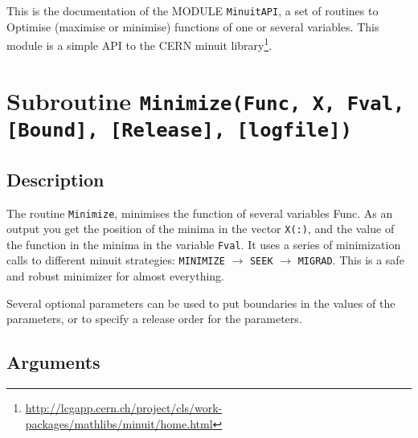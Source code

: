 
This is the documentation of the MODULE \texttt{MinuitAPI}, a set
of routines to Optimise (maximise or minimise) functions of one or
several variables. This module is a simple API to the CERN minuit
library\footnote{\href{http://lcgapp.cern.ch/project/cls/work-packages/mathlibs/minuit/home.html}{http://lcgapp.cern.ch/project/cls/work-packages/mathlibs/minuit/home.html}}. 

\section{Subroutine \texttt{Minimize(Func, X, Fval, [Bound], [Release], [logfile]) }}

\subsection{Description}

The routine \texttt{Minimize}, minimises the function of several
variables Func. As an output you get the position of the minima in the
vector \texttt{X(:)}, and the value of the function in the minima in
the variable \texttt{Fval}. It uses a series of minimization calls to
different minuit strategies: \texttt{MINIMIZE} $\rightarrow$
\texttt{SEEK} $\rightarrow$ \texttt{MIGRAD}. This is a safe and robust
minimizer for almost everything.

Several optional parameters can be used to put boundaries in the
values of the parameters, or to specify a release order for the
parameters. 

\subsection{Arguments}

